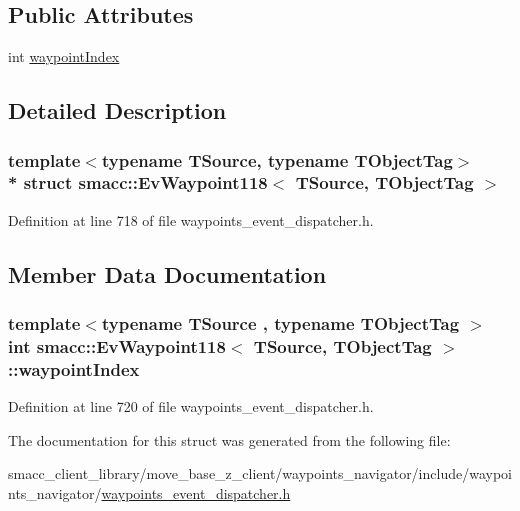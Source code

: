 \subsection*{Public Attributes}
\begin{DoxyCompactItemize}
\item 
int \hyperlink{structsmacc_1_1EvWaypoint118_a40daf2cd1c9a01f19f80c0be60768e19}{waypoint\+Index}
\end{DoxyCompactItemize}


\subsection{Detailed Description}
\subsubsection*{template$<$typename T\+Source, typename T\+Object\+Tag$>$\\*
struct smacc\+::\+Ev\+Waypoint118$<$ T\+Source, T\+Object\+Tag $>$}



Definition at line 718 of file waypoints\+\_\+event\+\_\+dispatcher.\+h.



\subsection{Member Data Documentation}
\subsubsection[{\texorpdfstring{waypoint\+Index}{waypointIndex}}]{\setlength{\rightskip}{0pt plus 5cm}template$<$typename T\+Source , typename T\+Object\+Tag $>$ int {\bf smacc\+::\+Ev\+Waypoint118}$<$ T\+Source, T\+Object\+Tag $>$\+::waypoint\+Index}\hypertarget{structsmacc_1_1EvWaypoint118_a40daf2cd1c9a01f19f80c0be60768e19}{}\label{structsmacc_1_1EvWaypoint118_a40daf2cd1c9a01f19f80c0be60768e19}


Definition at line 720 of file waypoints\+\_\+event\+\_\+dispatcher.\+h.



The documentation for this struct was generated from the following file\+:\begin{DoxyCompactItemize}
\item 
smacc\+\_\+client\+\_\+library/move\+\_\+base\+\_\+z\+\_\+client/waypoints\+\_\+navigator/include/waypoints\+\_\+navigator/\hyperlink{waypoints__event__dispatcher_8h}{waypoints\+\_\+event\+\_\+dispatcher.\+h}\end{DoxyCompactItemize}
